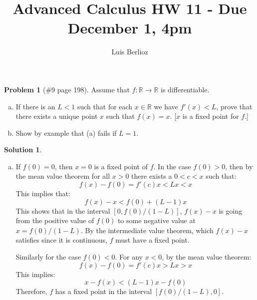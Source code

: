 \documentclass{article}
\theoremstyle{definition}
\newtheorem*{soln}{Solution}
\newtheorem*{prob}{Problem}
\theoremstyle{theorem}
\newcommand{\R}{\mathbb{R}}
\begin{document}
\title{Advanced Calculus HW 11 - Due December 1, 4pm}
\author{Luis Berlioz}
\maketitle



\begin{prob}[\#9 page 198]
    Assume that $f: \R \to \R$ is differentiable.
    \begin{enumerate}[(a)]
        \item If there is an $L<1$ such that for each $x\in \R$ we have $f'(x)<L$, prove that there exists a unique point $x$ such that $f(x) =x$. [$x$ is a fixed point for $f$.]        
        \item Show by example that (a) fails if $L=1$.
    \end{enumerate}
\end{prob}
\begin{soln}
    \begin{enumerate}[(a)]
        \item If $f(0)=0$, then $x=0$ is a fixed point of $f$. In the case $f(0)>0$, then by the mean value theorem for all $x>0$ there exists a $0< c< x$ such that:
            $$f(x) - f(0) = f'(c)x < Lx < x$$
            This implies that:
            $$f(x) -x < f(0) +(L-1)x$$
            This shows that  in the interval $[0,f(0)/(1-L)]$, $f(x) -x$ is going from the positive value of $f(0)$ to some negative value at $x=f(0)/(1-L)$. By the intermediate value theorem, which $f(x) - x$ satisfies since it is continuous, $f$ must have a fixed point.

            Similarly for the case $f(0)<0$. For any $x<0$, by the mean value theorem:
            $$f(x) - f(0) = f'(c)x > Lx > x$$
            This implies:
            $$x-f(x) < (L-1)x -f(0)$$
            Therefore, $f$ has a fixed point in the interval $[f(0)/(1-L), 0]$.
    \end{enumerate}
\end{soln}
\vspace{1in}
\end{document}

